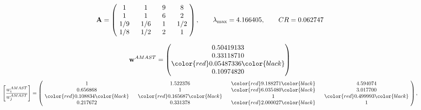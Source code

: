 \begin{example}
\begin{equation*}
\mathbf{A} =
\begin{pmatrix}
$\,\,$ 1 $\,\,$ & $\,\,$1$\,\,$ & $\,\,$9$\,\,$ & $\,\,$8 $\,\,$ \\
$\,\,$ 1 $\,\,$ & $\,\,$ 1 $\,\,$ & $\,\,$6$\,\,$ & $\,\,$2 $\,\,$ \\
$\,\,$ 1/9$\,\,$ & $\,\,$ 1/6$\,\,$ & $\,\,$ 1 $\,\,$ & $\,\,$ 1/2 $\,\,$ \\
$\,\,$ 1/8$\,\,$ & $\,\,$ 1/2$\,\,$ & $\,\,$2$\,\,$ & $\,\,$ 1  $\,\,$ \\
\end{pmatrix},
\qquad
\lambda_{\max} =
4.166405,
\qquad
CR = 0.062747
\end{equation*}

\begin{equation*}
\mathbf{w}^{AMAST} =
\begin{pmatrix}
0.50419133\\
0.33118710\\
\color{red} 0.05487336\color{black} \\
0.10974820
\end{pmatrix}\end{equation*}
\begin{equation*}
\left[ \frac{{w}^{AMAST}_i}{{w}^{AMAST}_j} \right] =
\begin{pmatrix}
$\,\,$ 1 $\,\,$ & $\,\,$1.522376$\,\,$ & $\,\,$\color{red} 9.188271\color{black} $\,\,$ & $\,\,$4.594074$\,\,$ \\
$\,\,$0.656868$\,\,$ & $\,\,$ 1 $\,\,$ & $\,\,$\color{red} 6.035480\color{black} $\,\,$ & $\,\,$3.017700  $\,\,$ \\
$\,\,$\color{red} 0.108834\color{black} $\,\,$ & $\,\,$\color{red} 0.165687\color{black} $\,\,$ & $\,\,$ 1 $\,\,$ & $\,\,$\color{red} 0.499993\color{black}  $\,\,$ \\
$\,\,$0.217672$\,\,$ & $\,\,$0.331378$\,\,$ & $\,\,$\color{red} 2.000027\color{black} $\,\,$ & $\,\,$ 1  $\,\,$ \\
\end{pmatrix},
\end{equation*}


\end{example}
